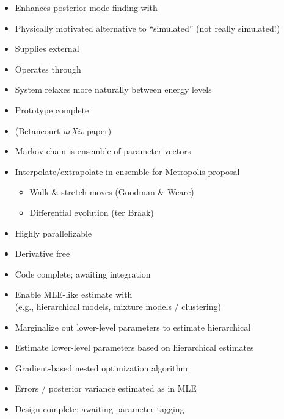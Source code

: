 \documentclass[10pt]{report}
\newcommand{\sld}[1]{\newpage{\noindent\LARGE \ \ \
    \textcolor{MidnightBlue}{\bfseries #1}}\vspace*{4pt}}
\newcommand{\myemph}[1]{{\color{MidnightBlue}{\bfseries #1}}}
\begin{document}
\sld{Thermodynamic Sampler}
\begin{itemize}
\item Enhances posterior mode-finding with \myemph{multiple modes}
\item Physically motivated alternative to ``simulated''
  \myemph{annealing and tempering} (not really simulated!)
\item Supplies external \myemph{heat bath}
\item Operates through \myemph{contact manifold}
\item System relaxes more naturally between energy levels
\vfill
\item Prototype complete
\item {\small (Betancourt {\slshape arXiv} paper)}
\end{itemize}

\sld{Ensemble MCMC}
\begin{itemize}
\item Markov chain is ensemble of parameter vectors
\item Interpolate/extrapolate in ensemble for Metropolis proposal
\begin{itemize}\small
\item Walk \& stretch moves (Goodman \& Weare)
\item Differential evolution (ter Braak)
\end{itemize}
\item Highly parallelizable
\item Derivative free
\vfill
\item Code complete; awaiting integration
\end{itemize}



\sld{\Large Marginal Maximum Likelihood (MML)}
\begin{itemize}
\item Enable MLE-like estimate with \myemph{infinite likelihoods}
\\ {\small (e.g., hierarchical models, mixture models / clustering)}
\item Marginalize out lower-level parameters to estimate hierarchical
\item Estimate lower-level parameters based on hierarchical estimates
\item Gradient-based nested optimization algorithm
\item Errors / posterior variance estimated as in MLE
\vfill
\item Design complete; awaiting parameter tagging
\end{itemize}
\end{document}
